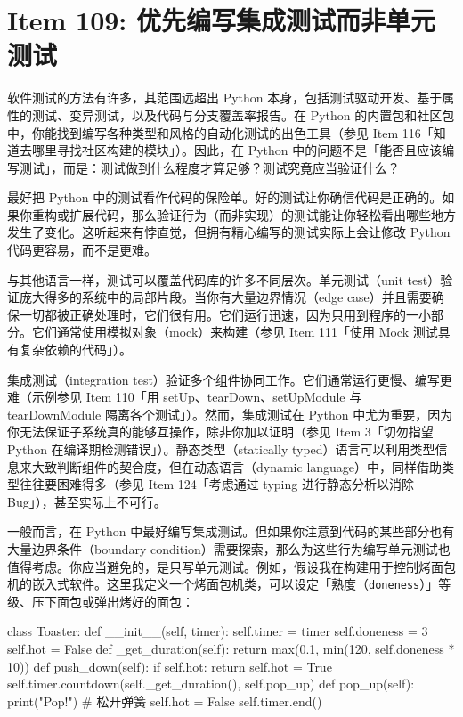 \section{Item 109: 优先编写集成测试而非单元测试}

软件测试的方法有许多，其范围远超出 Python 本身，包括测试驱动开发、基于属性的测试、变异测试，以及代码与分支覆盖率报告。在 Python 的内置包和社区包中，你能找到编写各种类型和风格的自动化测试的出色工具（参见 Item 116「知道去哪里寻找社区构建的模块」）。因此，在 Python 中的问题不是「能否且应该编写测试」，而是：测试做到什么程度才算足够？测试究竟应当验证什么？

最好把 Python 中的测试看作代码的保险单。好的测试让你确信代码是正确的。如果你重构或扩展代码，那么验证行为（而非实现）的测试能让你轻松看出哪些地方发生了变化。这听起来有悖直觉，但拥有精心编写的测试实际上会让修改 Python 代码更容易，而不是更难。

与其他语言一样，测试可以覆盖代码库的许多不同层次。单元测试（unit test）验证庞大得多的系统中的局部片段。当你有大量边界情况（edge case）并且需要确保一切都被正确处理时，它们很有用。它们运行迅速，因为只用到程序的一小部分。它们通常使用模拟对象（mock）来构建（参见 Item 111「使用 Mock 测试具有复杂依赖的代码」）。

集成测试（integration test）验证多个组件协同工作。它们通常运行更慢、编写更难（示例参见 Item 110「用 setUp、tearDown、setUpModule 与 tearDownModule 隔离各个测试」）。然而，集成测试在 Python 中尤为重要，因为你无法保证子系统真的能够互操作，除非你加以证明（参见 Item 3「切勿指望 Python 在编译期检测错误」）。静态类型（statically typed）语言可以利用类型信息来大致判断组件的契合度，但在动态语言（dynamic language）中，同样借助类型往往要困难得多（参见 Item 124「考虑通过 typing 进行静态分析以消除 Bug」），甚至实际上不可行。

一般而言，在 Python 中最好编写集成测试。但如果你注意到代码的某些部分也有大量边界条件（boundary condition）需要探索，那么为这些行为编写单元测试也值得考虑。你应当避免的，是只写单元测试。例如，假设我在构建用于控制烤面包机的嵌入式软件。这里我定义一个烤面包机类，可以设定「熟度（\texttt{doneness}）」等级、压下面包或弹出烤好的面包：

\begin{codebox}[python]
class Toaster:
    def __init__(self, timer):
        self.timer = timer
        self.doneness = 3
        self.hot = False
    def _get_duration(self):
        return max(0.1, min(120, self.doneness * 10))
    def push_down(self):
        if self.hot:
            return
        self.hot = True
        self.timer.countdown(self._get_duration(), self.pop_up)
    def pop_up(self):
        print("Pop!")  # 松开弹簧
        self.hot = False
        self.timer.end()
\end{codebox}

